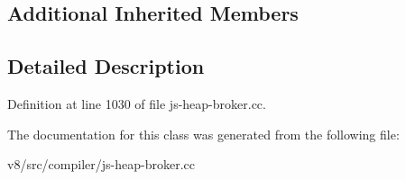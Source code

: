 \subsection*{Additional Inherited Members}


\subsection{Detailed Description}


Definition at line 1030 of file js-\/heap-\/broker.\+cc.



The documentation for this class was generated from the following file\+:\begin{DoxyCompactItemize}
\item 
v8/src/compiler/js-\/heap-\/broker.\+cc\end{DoxyCompactItemize}

